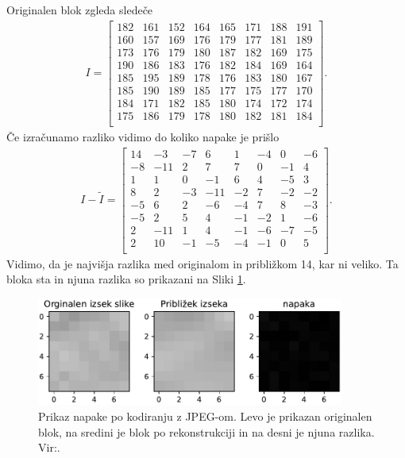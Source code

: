 \documentclass[a4paper,12pt,openright]{book}
\begin{document}
Originalen blok zgleda sledeče
\begin{gather*}
 I =
  \begin{bmatrix}
 182& 161& 152& 164& 165& 171& 188& 191\\
 160& 157& 169& 176& 179& 177& 181& 189\\
 173& 176& 179& 180& 187& 182& 169& 175\\
 190& 186& 183& 176& 182& 184& 169& 164\\
 185& 195& 189& 178& 176& 183& 180& 167\\
 185& 190& 189& 185& 177& 175& 177& 170\\
 184& 171& 182& 185& 180& 174& 172& 174\\
 175& 186& 179& 178& 180& 182& 181& 184\\
   \end{bmatrix}.
\end{gather*}
Če izračunamo razliko vidimo do koliko napake je prišlo
\begin{gather*}
 I - \widetilde{I}=
  \begin{bmatrix}
 14&  -3&  -7&   6&   1&  -4&   0&  -6\\
 -8& -11&   2&   7&   7&   0&  -1&   4\\
  1&   1&   0&  -1&   6&   4&  -5&   3\\
  8&   2&  -3& -11&  -2&   7&  -2&  -2\\
 -5&   6&   2&  -6&  -4&   7&   8&  -3\\
 -5&   2&   5&   4&  -1&  -2&   1&  -6\\
  2& -11&   1&   4&  -1&  -6&  -7&  -5\\
  2&  10&  -1&  -5&  -4&  -1&   0&   5\\
   \end{bmatrix}.
\end{gather*}
Vidimo, da je najvišja razlika med originalom in približkom 14, kar ni veliko. Ta bloka sta in njuna razlika so prikazani na Sliki \ref{kodiranje_dekodiranje_napaka}.

\begin{figure}[ht] %
\begin{center}
\includegraphics[width=0.9\textwidth]{slike/izsek_primerjava_napaka_Primera.pdf}
\end{center}
\caption{Prikaz napake po kodiranju z JPEG-om. Levo je prikazan originalen blok, na sredini je blok po rekonstrukciji in na desni je njuna razlika. Vir:.}%
\label{kodiranje_dekodiranje_napaka}
\end{figure}
\end{document}
